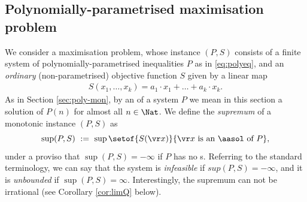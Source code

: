 

\subsection{Polynomially-parametrised maximisation problem}

We consider a maximisation problem, whose instance 
$(P,S)$ consists of a finite system of polynomially-parametrised 
inequalities $P$ as in \eqref{eq:polyeq}, and an \emph{ordinary} (non-parametrised)
objective function $S$ given by a linear map
\begin{align*} %
S(x_1, \ldots, x_k) = 
a_1 \cdot x_1 + \ldots + a_k \cdot x_k.
\end{align*}
%
%
%
%
As in Section \ref{sec:poly-mon}, %
by an \emph{\aasol} of a system $P$ we mean in this section a solution of $P(n)$ 
for almost all $n\in\Nat$.  %
%
We define the \emph{supremum} of a monotonic instance $(P, S)$ 
as
\[
\sup (P, S) \ := \ \sup \setof{S(\vr x)}{\vr x \text{ is an \aasol of } P},
\]
under a proviso that $\sup (P,S) = -\infty$ if $P$ has no {\aasol}s.
Referring to the standard terminology, we can say that the system is \emph{infeasible} if
$sup (P,S) = -\infty$, and it is \emph{unbounded} if $\sup (P, S) = \infty$.
%
%
Interestingly, the supremum can not be irrational
(see Corollary \ref{cor:limQ} below).
%



